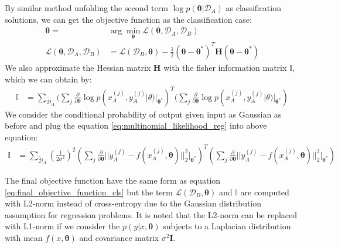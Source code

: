 \documentclass{article}
\begin{document}
By similar method unfolding the second term $\log p(\boldsymbol{\theta}| \mathcal D_A)$ as classification solutions,
we can get the objective function as the classification case:
\begin{equation}
\begin{split}
\boldsymbol{\theta} = & \arg \min_{\boldsymbol{\theta}} \mathcal L(\boldsymbol{\theta}, \mathcal D_A, \mathcal D_B) \\
\mathcal L(\boldsymbol{\theta}, \mathcal D_A, \mathcal D_B)  &= \mathcal L(\mathcal D_B, \boldsymbol{\theta}) 
-\frac{1}{2}(\boldsymbol{\theta} - \boldsymbol{\theta^*})^T\boldsymbol{H} (\boldsymbol{\theta} - \boldsymbol{\theta^*})        
\end{split}
\end{equation}
We also approximate the Hessian matrix $\boldsymbol{H}$ with the fisher information matrix $\mathbb{I}$,
which we can obtain by:
\begin{equation}
\begin{split}
\mathbb{I} 
&= \sum_{\tilde{\mathcal D}_A}
(\sum_j \frac{\partial}{\partial \boldsymbol{\theta}}
\log p(x_A^{(j)}, y_A^{(j)}|\boldsymbol{}{\theta})|_{\boldsymbol{\theta^*}})^T
(\sum_j \frac{\partial}{\partial \boldsymbol{\theta}}
\log p(x_A^{(j)}, y_A^{(j)}|\boldsymbol{}{\theta})|_{\boldsymbol{\theta^*}})
\end{split}
\end{equation}
We consider the conditional probability of output given input
as Gaussian as before
and plug the equation \ref{eq:multinomial_likelihood_reg} into above equation:
\begin{equation}
\begin{split}
\mathbb{I} 
&= 
\sum_{\tilde{\mathcal D}_A}
(\frac{1}{2\sigma^2})^2 
(\sum_j \frac{\partial}{\partial \boldsymbol{\theta}}
||y_A^{(j)} - f(x_A^{(j)}, \boldsymbol{\theta})||_2^2|_{\boldsymbol{\theta^*}})^T
(\sum_j \frac{\partial}{\partial \boldsymbol{\theta}}
||y_A^{(j)} - f(x_A^{(j)}, \boldsymbol{\theta})||_2^2|_{\boldsymbol{\theta^*}})
\end{split}
\end{equation}

The final objective function have the same form as equation \ref{eq:final_objective_function_cls}
but the term $\mathcal L(\mathcal D_B, \boldsymbol{\theta})$
and $\mathbb{I}$ are computed with L2-norm instead of cross-entropy due to 
the Gaussian distribution assumption for regression problems.
It is noted that the L2-norm can be replaced with L1-norm if we consider
the $p(y|x, \boldsymbol{\theta})$ subjects to a Laplacian distribution 
with mean $f(x, \boldsymbol{\theta})$ and covariance matrix $\sigma^2\boldsymbol{I}$.
\end{document}
